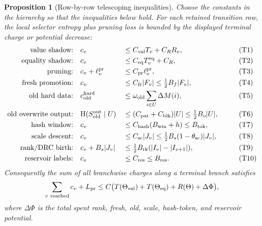 \documentclass[11pt]{article}
\newtheorem{proposition}[theorem]{Proposition}
\theoremstyle{remark}
\newcommand{\HH}{\mathrm H}
\newcommand{\pr}{\mathrm{pr}}
\newcommand{\win}{\mathrm{win}}
\newcommand{\old}{\mathrm{old}}
\newcommand{\fr}{\mathrm{fr}}
\newcommand{\scal}{\mathrm{sc}}
\newcommand{\rk}{\mathrm{rk}}
\begin{document}
\begin{proposition}[Row-by-row telescoping inequalities]\label{prop:appendix-row-telescope}
Choose the constants in the hierarchy so that the inequalities below hold.  For each retained transition row, the local selector entropy plus pruning loss is bounded by the displayed terminal charge or potential decrease:
\begin{alignat}{3}
\text{value shadow:}       &\quad c_v &&\le C_{\rm val}T_v+C_R R_v,                                      &&\tag{T1}\label{eq:T1}\\
\text{equality shadow:}    &\quad c_v &&\le C_{\rm eq}T^{\rm eq}_v+C_R,                                  &&\tag{T2}\label{eq:T2}\\
\text{pruning:}            &\quad c_v+\ell_v^{\pr} &&\le C_{\pr}\ell_v^{\pr},                            &&\tag{T3}\label{eq:T3}\\
\text{fresh promotion:}    &\quad c_v &&\le C_{\fr}|F_v|\le \tfrac12 B_f|F_v|,                            &&\tag{T4}\label{eq:T4}\\
\text{old hard data:}      &\quad c_{\old}^{\rm hard} &&\le \omega_{\old}\sum_{i\in U}\Delta M(i),                  &&\tag{T5}\label{eq:T5}\\
\text{old overwrite output:} &\quad \HH(S_{\old}^{\rm out}\mid U) &&\le (C_{\rm pat}+C_{\rm blk})|U|\le \tfrac12 B_o|U|,            &&\tag{T6}\label{eq:T6}\\
\text{hash window:}        &\quad c_v &&\le C_{\rm hash}(B_{\win}+h)\le B_{\rm tok},                     &&\tag{T7}\label{eq:T7}\\
\text{scale descent:}      &\quad c_v &&\le C_{\scal}|J_v|\le \tfrac12 B_s(1-\theta_{\scal})|J_v|,         &&\tag{T8}\label{eq:T8}\\
\text{rank/DRC birth:}     &\quad c_v+B_s|J_v| &&\le \tfrac12 B_{\rk}(|I_v|-|I_{v+1}|),                  &&\tag{T9}\label{eq:T9}\\
\text{reservoir labels:}   &\quad c_v &&\le C_{\rm res}\le B_{\rm res}.                                  &&\tag{T10}\label{eq:T10}
\end{alignat}
Consequently the sum of all branchwise charges along a terminal branch satisfies
\[
        \sum_{v\ {\rm reached}} c_v+L_{\pr}
        \le C\bigl(T(\Theta_{\rm val})+T(\Theta_{\rm eq})+R(\Theta)+\Delta\Phi\bigr),
\]
where $\Delta\Phi$ is the total spent rank, fresh, old, scale, hash-token, and reservoir potential.
\end{proposition}
\end{document}
